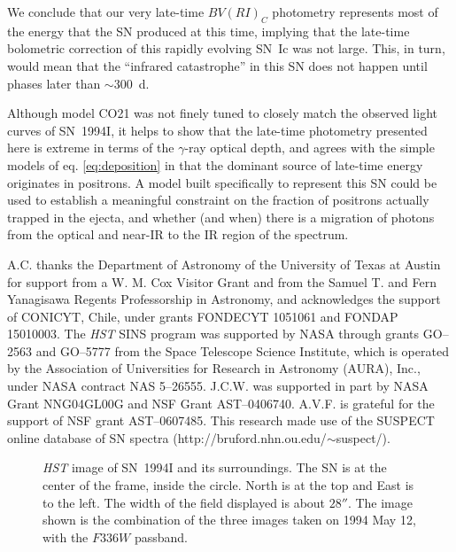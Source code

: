\documentclass[12pt,manuscript]{aastex}
\begin{document}
We conclude that our very late-time $BV(RI)_C$ photometry
represents most of the energy that the SN produced at
this time, implying that the late-time bolometric correction of 
this rapidly evolving SN~Ic was not large.
%
This, in turn, would mean that the ``infrared catastrophe'' in 
this SN does not happen until phases later than $\sim$300~d.


Although model CO21 was not finely tuned to closely match 
the observed light curves of SN~1994I, it helps to show that
the late-time photometry presented here is extreme in terms 
of the $\gamma$-ray optical depth, and agrees with the simple
models of eq. \ref{eq:deposition} in that the dominant source 
of late-time energy originates in positrons.
%
A model built specifically to represent this SN could be 
used to establish a meaningful constraint on the fraction 
of positrons actually trapped in the ejecta, and whether
(and when) there is a migration of photons from the optical 
and near-IR to the IR region of the spectrum.

\acknowledgments A.C. thanks the Department of Astronomy of 
the University of Texas at Austin for support from a W. M. Cox 
Visitor Grant and from the Samuel T. and Fern Yanagisawa 
Regents Professorship in Astronomy, and acknowledges the  
support of CONICYT, Chile, under grants FONDECYT 1051061 and
FONDAP 15010003. 
%
The {\it HST} SINS program was supported by 
NASA through grants GO--2563 and GO--5777 from the Space Telescope Science
Institute, which is operated by the Association of Universities 
for Research in Astronomy (AURA), Inc., under NASA contract 
NAS 5--26555.
%
J.C.W. was supported in part by NASA Grant NNG04GL00G and NSF 
Grant AST--0406740. A.V.F. is grateful for the support of
NSF grant AST--0607485.
%
This research made use of the SUSPECT online database 
of SN spectra (http://bruford.nhn.ou.edu/$\sim$suspect/).

\begin{thebibliography}{}

\end{thebibliography}

\clearpage

\begin{figure}
\caption{\label{fi:finder}
{\em HST} image of SN~1994I and its surroundings.
The SN is at the center of the frame, inside the circle.
North is at the top and East is to the left. The width of the 
field displayed is about $28''$. The image shown is the 
combination of the three images taken on 1994 May 12, with 
the $F336W$ passband.
}
\end{figure}
\end{document}
